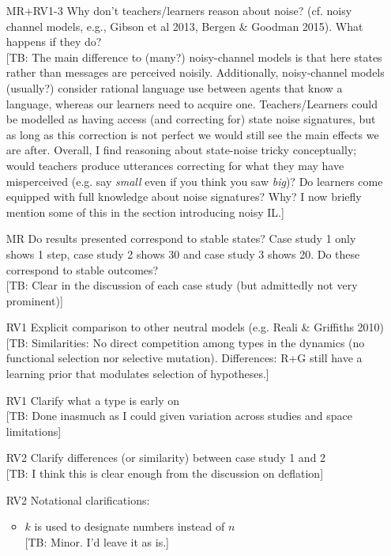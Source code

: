 \documentclass[10pt,a4paper]{article}
\newcommand{\tb}[1]{\textcolor[rgb]{.8,.33,.0}{[TB: #1]}}%
\begin{document}
  \begin{itemize}
    \item [MR+RV1-3] Why don't teachers/learners reason about noise? (cf. noisy channel models, e.g., Gibson et al 2013, Bergen \& Goodman 2015). What happens if they do?\\ \tb{The main difference to (many?) noisy-channel models is that here states rather than messages are perceived noisily. Additionally, noisy-channel models (usually?) consider rational language use between agents that know a language, whereas our learners need to acquire one. Teachers/Learners could be modelled as having access (and correcting for) state noise signatures, but as long as this correction is not perfect we would still see the main effects we are after. Overall, I find reasoning about state-noise tricky conceptually; would teachers produce utterances correcting for what they may have misperceived (e.g. say {\em small} even if you think you saw {\em big})? Do learners come equipped with full knowledge about noise signatures? Why? I now briefly mention some of this in the section introducing noisy IL.} 
    \item [MR] Do results presented correspond to stable states? Case study 1 only shows 1 step, case study 2 shows 30 and case study 3 shows 20. Do these correspond to stable outcomes?\\ \tb{Clear in the discussion of each case study (but admittedly not very prominent)}
    \item [RV1] Explicit comparison to other neutral models (e.g. Reali \& Griffiths 2010)\\ \tb{Similarities: No direct competition among types in the dynamics (no functional selection nor selective mutation). Differences: R+G still have a learning prior that modulates selection of hypotheses.} 
    \item [RV1] Clarify what a type is early on\\ \tb{Done inasmuch as I could given variation across studies and space limitations}
    \item [RV2] Clarify differences (or similarity) between case study 1 and 2\\\tb{I think this is clear enough from the discussion on deflation}
    \item [RV2] Notational clarifications:
      \begin{itemize}
	\item $k$ is used to designate numbers instead of $n$\\ \tb{Minor. I'd leave it as is.}

\end{itemize}
\end{itemize}
\end{document}
